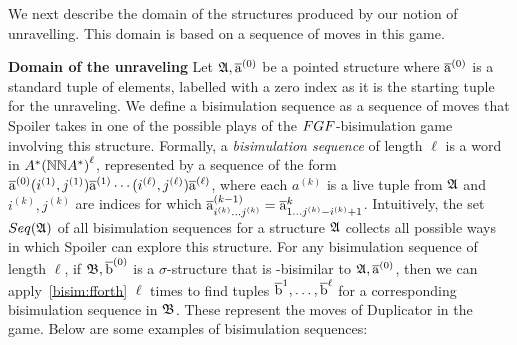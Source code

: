 \noindent
We next describe the domain of the structures produced by our notion of unravelling.
This domain is based on a sequence of moves in this game.

\noindent \textbf{Domain of the unraveling}
Let ${\mathfrak{A}}, \overline{\mathrm{a}}^{(0)}$ be a pointed structure where $\overline{\mathrm{a}}^{(0)}$ is a standard tuple of elements, labelled with a zero index as it is the starting tuple for the unraveling.
We define a bisimulation sequence as a sequence of moves that Spoiler takes in one of the possible plays of the $\FGF$-bisimulation game involving this structure.
Formally, a \emph{bisimulation sequence} of length $\ell$ is a word in $A^*{({\mathbb{N}}{\mathbb{N}}{}A^{*})}^{\ell}$, represented by a sequence of the form $\overline{\mathrm{a}}^{(0)}(i^{(1)}, j^{(1)})\overline{\mathrm{a}}^{(1)}\cdots(i^{(\ell)}, j^{(\ell)})\overline{\mathrm{a}}^{(\ell)}$, where each $a^{(k)}$ is a live tuple from ${\mathfrak{A}}$ and $i^{(k)}, j^{(k)}$ are indices for which $\overline{\mathrm{a}}_{i^{(k)}\ldots j^{(k)}}^{(k-1)} = \overline{\mathrm{a}}_{1\ldots j^{(k)}-i^{(k)}+1}^{k}$.
Intuitively, the set $\Seq{A}$ of all bisimulation sequences for a structure ${\mathfrak{A}}$ collects all possible ways in which Spoiler can explore this structure.
For any bisimulation sequence of length $\ell$, if ${\mathfrak{B}}, \overline{\mathrm{b}}^{(0)}$ is a $\sigma$-structure that is \FGF-bisimilar to ${\mathfrak{A}}, \overline{\mathrm{a}}^{(0)}$, then we can apply~\ref{bisim:fforth} $\ell$ times to find tuples $\overline{\mathrm{b}}^{1}, \ldots, \overline{\mathrm{b}}^{\ell}$ for a corresponding bisimulation sequence in ${\mathfrak{B}}$.
These represent the moves of Duplicator in the game.
Below are some examples of bisimulation sequences:
